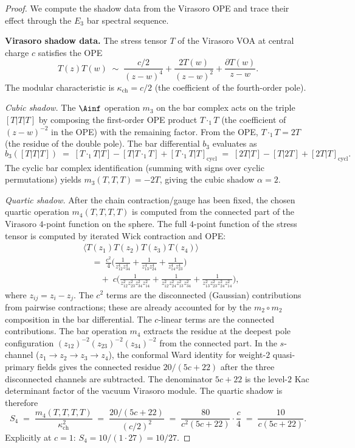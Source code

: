 \begin{proof}
We compute the shadow data from the Virasoro OPE and trace their effect
through the \(E_3\) bar spectral sequence.

\smallskip\noindent\textbf{Virasoro shadow data.}
The stress tensor $T$ of the Virasoro VOA at central charge $c$ satisfies the OPE
\[
 T(z) T(w) \;\sim\; \frac{c/2}{(z-w)^4} + \frac{2T(w)}{(z-w)^2} + \frac{\partial T(w)}{z-w}.
\]
The modular characteristic is $\kappa_{\mathrm{ch}} = c/2$ (the coefficient of the fourth-order pole).

\emph{Cubic shadow.} The $\Ainf$ operation $m_3$ on the bar complex acts on the triple $[T|T|T]$ by composing the first-order OPE product $T \cdot_1 T$ (the coefficient of $(z-w)^{-2}$ in the OPE) with the remaining factor. From the OPE, $T \cdot_1 T = 2T$ (the residue of the double pole). The bar differential $b_3$ evaluates as
\[
 b_3([T|T|T]) \;=\; [T \cdot_1 T | T] - [T | T \cdot_1 T] + [T \cdot_1 T | T]_{\mathrm{cycl}} \;=\; [2T|T] - [T|2T] + [2T|T]_{\mathrm{cycl}}.
\]
The cyclic bar complex identification (summing with signs over cyclic permutations) yields $m_3(T,T,T) = -2T$, giving the cubic shadow $\alpha = 2$.

\emph{Quartic shadow.} After the chain contraction/gauge has been
fixed, the chosen quartic operation \(m_4(T,T,T,T)\) is computed from
the connected part of the Virasoro \(4\)-point function on the sphere.
The full \(4\)-point function of the stress tensor is computed by
iterated Wick contraction and OPE:
\begin{align*}
 &\langle T(z_1) T(z_2) T(z_3) T(z_4) \rangle \\
 &\quad=\; \frac{c^2}{4}\biggl(\frac{1}{z_{12}^4 z_{34}^4} + \frac{1}{z_{13}^4 z_{24}^4} + \frac{1}{z_{14}^4 z_{23}^4}\biggr) \\
 &\qquad+\; c\biggl(\frac{1}{z_{12}^2 z_{23}^2 z_{34}^2 z_{14}^2} + \frac{1}{z_{12}^2 z_{24}^2 z_{13}^2 z_{34}^2} + \frac{1}{z_{13}^2 z_{23}^2 z_{24}^2 z_{14}^2}\biggr),
\end{align*}
where $z_{ij} = z_i - z_j$. The $c^2$ terms are the disconnected (Gaussian) contributions from pairwise contractions; these are already accounted for by the $m_2 \circ m_2$ composition in the bar differential. The $c$-linear terms are the connected contributions. The bar operation $m_4$ extracts the residue at the deepest pole configuration $(z_{12})^{-2}(z_{23})^{-2}(z_{34})^{-2}$ from the connected part. In the $s$-channel ($z_1 \to z_2 \to z_3 \to z_4$), the conformal Ward identity for weight-$2$ quasi-primary fields gives the connected residue \(20/(5c+22)\) after the three disconnected channels are subtracted. The denominator \(5c+22\) is the level-$2$ Kac determinant factor of the vacuum Virasoro module. The quartic shadow is therefore
\[
 S_4 \;=\; \frac{m_4(T,T,T,T)}{\kappa_{\mathrm{ch}}^2} \;=\; \frac{20/(5c+22)}{(c/2)^2} \;=\; \frac{80}{c^2(5c+22)} \cdot \frac{c}{4} \;=\; \frac{10}{c(5c+22)}.
\]
Explicitly at $c = 1$: $S_4 = 10/(1 \cdot 27) = 10/27$.


\end{proof}
